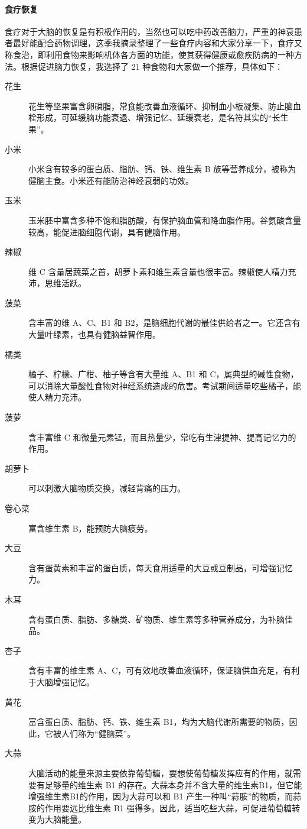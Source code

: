 \paragraph{食疗恢复} 食疗对于大脑的恢复是有积极作用的，当然也可以吃中药改善脑力，严重的神衰患者最好能配合药物调理，这季我摘录整理了一些食疗内容和大家分享一下，食疗又称食治，即利用食物来影响机体各方面的功能，使其获得健康或愈疾防病的一种方法。根据促进脑力恢复，我选择了 21 种食物和大家做一个推荐，具体如下：

\begin{description}
    \item[花生] 花生等坚果富含卵磷脂，常食能改善血液循环、抑制血小板凝集、防止脑血栓形成，可延缓脑功能衰退、增强记忆、延缓衰老，是名符其实的“长生果”。
    \item[小米] 小米含有较多的蛋白质、脂肪、钙、铁、维生素 B 族等营养成分，被称为健脑主食。小米还有能防治神经衰弱的功效。
    \item[玉米] 玉米胚中富含多种不饱和脂肪酸，有保护脑血管和降血脂作用。谷氨酸含量较高，能促进脑细胞代谢，具有健脑作用。
    \item[辣椒] 维 C 含量居蔬菜之首，胡萝卜素和维生素含量也很丰富。辣椒使人精力充沛，思维活跃。
    \item[菠菜] 含丰富的维 A、C、B1 和 B2，是脑细胞代谢的最佳供给者之一。它还含有大量叶绿素，也具有健脑益智作用。
    \item[橘类] 橘子、柠檬、广柑、柚子等含有大量维 A、B1 和 C，属典型的碱性食物，可以消除大量酸性食物对神经系统造成的危害。考试期间适量吃些橘子，能使人精力充沛。
    \item[菠萝] 含丰富维 C 和微量元素锰，而且热量少，常吃有生津提神、提高记忆力的作用。
    \item[胡萝卜] 可以刺激大脑物质交换，减轻背痛的压力。
    \item[卷心菜] 富含维生素 B，能预防大脑疲劳。
    \item[大豆] 含有蛋黄素和丰富的蛋白质，每天食用适量的大豆或豆制品，可增强记忆力。
    \item[木耳] 含有蛋白质、脂肪、多糖类、矿物质、维生素等多种营养成分，为补脑佳品。
    \item[杏子] 含有丰富的维生素 A、C，可有效地改善血液循环，保证脑供血充足，有利于大脑增强记忆。
    \item[黄花] 富含蛋白质、脂肪、钙、铁、维生素 B1，均为大脑代谢所需要的物质，因此，它被人们称为“健脑菜”。
    \item[大蒜] 大脑活动的能量来源主要依靠葡萄糖，要想使葡萄糖发挥应有的作用，就需要有足够量的维生素 B1 的存在。大蒜本身并不含大量的维生素B1，但它能增强维生素B1的作用，因为大蒜可以和 B1 产生一种叫“蒜胺”的物质，而蒜胺的作用要远比维生素 B1 强得多。因此，适当吃些大蒜，可促进葡萄糖转变为大脑能量。

\end{description}
